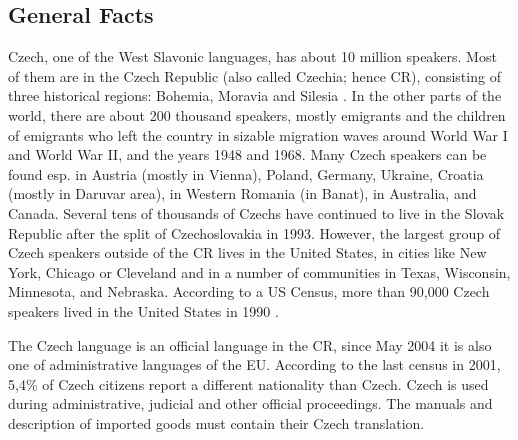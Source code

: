\begin{multicols}{2}

\subsection{General Facts}

Czech, one of the West Slavonic languages, has about 10 million speakers. Most of them are in the Czech Republic (also called Czechia; hence CR), consisting of three historical regions: Bohemia, Moravia and Silesia \cite{Note1}. In the other parts of the world, there are about 200 thousand speakers, mostly emigrants and the children of emigrants who left the country in sizable migration waves around World War I and World War II, and the years 1948 and 1968. Many Czech speakers can be found esp. in Austria (mostly in Vienna), Poland, Germany, Ukraine, Croatia (mostly in Daruvar area), in Western Romania (in Banat), in Australia, and Canada. Several tens of thousands of Czechs have continued to live in the Slovak Republic after the split of Czechoslovakia in 1993. However, the largest group of Czech speakers outside of the CR lives in the United States, in cities like New York, Chicago or Cleveland and in a number of communities in Texas, Wisconsin, Minnesota, and Nebraska. According to a US Census, more than 90,000 Czech speakers lived in the United States in 1990 \cite{Note2}.

The Czech language is an official language in the CR, since May 2004 it is also one of administrative languages of the EU. According to the last census in 2001, 5,4\% of Czech citizens report a different nationality than Czech. Czech is used during administrative, judicial and other official proceedings. The manuals and description of imported goods must contain their Czech translation.


\end{multicols}
